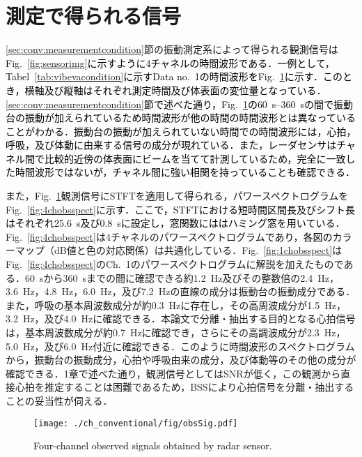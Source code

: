 \section{測定で得られる信号}
\label{sec:conv:signal}
\ref{sec:conv:measurementcondition}節の{振動測定系}によって得られる\textcolor{black}{観測信号はFig.~\ref{fig:sensorimg}に示すように4チャネルの時間波形である．一例として，Tabel~\ref{tab:vibevacondition}に示すData no.~1の時間波形をFig.~\ref{fig:obssig}に示す．このとき，横軸及び縦軸はそれぞれ測定時間及び体表面の変位量となっている．\ref{sec:conv:measurementcondition}節で述べた通り，Fig.~\ref{fig:obssig}の\textcolor{black}{60~s--360~s}の間で\textcolor{black}{振動台の振動}が加えられているため時間波形が他の時間の時間波形とは異なっていることがわかる．\textcolor{black}{振動台の振動}が加えられていない時間での時間波形には，心拍，呼吸，及び体動\textcolor{black}{に由来する信号の}成分が現れている．また，レーダセンサはチャネル間で\textcolor{black}{比較的近傍の体表面}にビームを当てて\textcolor{black}{計測}しているため，完全に一致した時間波形ではないが，チャネル間に強い相関を持っていることも確認できる．}

{また，\textcolor{black}{Fig.~\ref{fig:obssig}}観測信号にSTFTを適用して得られる，パワースペクトログラムをFig.~\ref{fig:4chobsspect}に\textcolor{black}{示す．ここで，STFTにおける短時間区間長及びシフト長はそれぞれ25.6~s及び0.8~sに設定し，窓関数にははハミング窓を用いている}．Fig.~\ref{fig:4chobsspect}は4チャネルのパワースペクトログラム\textcolor{black}{であり，各図の}カラーマップ（dB値と色の対応関係）は共通化している．Fig.~\ref{fig:1chobsspect}はFig.~\ref{fig:4chobsspect}のCh.~1のパワースペクトログラムに解説を加えたものである．60~sから360~sまでの間に確認できる約1.2~Hz及びその整数倍の2.4~Hz，3.6~Hz，4.8~Hz，6.0~Hz，及び7.2~Hzの直線の成分は振動台の振動成分である．また，呼吸の基本周波数成分が約0.3~Hzに存在し，その高周波成分が1.5~Hz，3.2~Hz，及び4.0~Hzに確認できる．本論文で分離・抽出する目的となる心拍信号は，基本周波数成分が約0.7~Hzに確認でき，さらにその高調波成分が2.3~Hz，5.0~Hz，及び6.0~Hz付近に確認できる．このように時間波形のスペクトログラムから，振動台の振動成分，心拍や呼吸由来の成分，及び体動等のその他の成分が確認できる．1章で述べた通り，観測信号としてはSNRが低く，この観測から直接心拍を推定することは困難であるため，BSSにより心拍信号を分離・抽出することの妥当性が伺える．}

\begin{figure}[b]
\centering
\texttt{[image: ./ch\_conventional/fig/obsSig.pdf]}
\caption{\textcolor{black}{Four-channel observed signals obtained by radar sensor.}}
\label{fig:obssig}
\end{figure}

